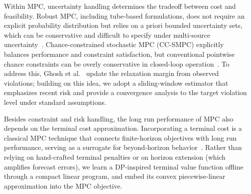 \documentclass[a4paper,fleqn]{cas-dc}
\theoremstyle{plain}
\theoremstyle{remark}
\theoremstyle{plain}
\begin{document}
Within MPC, uncertainty handling determines the tradeoff between cost and feasibility. Robust MPC, including tube-based formulations, does not require an explicit probability distribution but relies on a priori bounded uncertainty sets, which can be conservative and difficult to specify under multi-source uncertainty~\cite{singh2016_tube_mpc_contraction}. Chance-constrained stochastic MPC (CC-SMPC) explicitly balances performance and constraint satisfaction, but conventional pointwise chance constraints can be overly conservative in closed-loop operation~\cite{oldewurtel2013_adaptive_cc_smpc}. To address this, Ghosh et al.~\cite{ghosh2025_adaptive_relaxation_ccsmpc} update the relaxation margin from observed violations; building on this idea, we adopt a sliding-window estimator that emphasizes recent risk and provide a convergence analysis to the target violation level under standard assumptions.

Besides constraint and risk handling, the long run performance of MPC also depends on the terminal cost approximation. Incorporating a terminal cost is a classical MPC technique that connects finite-horizon objectives with long run performance, serving as a surrogate for beyond-horizon behavior~\cite{mayne2000_constrained_mpc}. Rather than relying on hand-crafted terminal penalties or on horizon extension (which amplifies forecast errors), we learn a DP-inspired terminal value function offline through a compact linear program, and embed its convex piecewise-linear approximation into the MPC objective.
\end{document}
